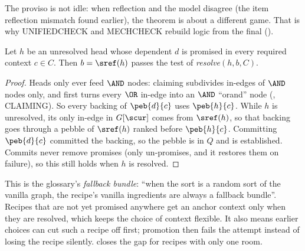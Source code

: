 The proviso is not idle: when reflection and the model disagree (the item reflection mismatch found earlier), the theorem is about a different game. That is why UNIFIEDCHECK and MECHCHECK rebuild logic from the final  ().

\begin{theorem}\label{thm:fallback}
Let $h$ be an unresolved head whose dependent $d$ is promised in every required context $c\in C$. Then $b=\sref(h)$ passes the test of \emph{resolve}$(h,b,C)$.
\end{theorem}
\begin{proof}
Heads only ever feed $\AND$ nodes: claiming subdivides in-edges of $\AND$ nodes only, and  first turns every $\OR$ in-edge into an $\AND$ ``orand'' node (, CLAIMING). So every backing of $\peb{d}{c}$ uses $\peb{h}{c}$. While $h$ is unresolved, its only in-edge in $G[\scur]$ comes from $\sref(h)$, so that backing goes through a pebble of $\sref(h)$ ranked before $\peb{h}{c}$. Committing $\peb{d}{c}$ committed the backing, so the pebble is in $Q$ and is established. Commits never remove promises (only  un-promises, and it restores them on failure), so this still holds when $h$ is resolved.
\end{proof}

This is the glossary's \emph{fallback bundle}: ``when the sort is a random sort of the vanilla graph, the recipe's vanilla ingredients are always a fallback bundle''. Recipes that are not yet promised anywhere get an anchor context only when they are resolved, which keeps the choice of context flexible. It also means earlier choices can cut such a recipe off first; promotion then fails the attempt instead of losing the recipe silently.  closes the gap for recipes with only one room.

